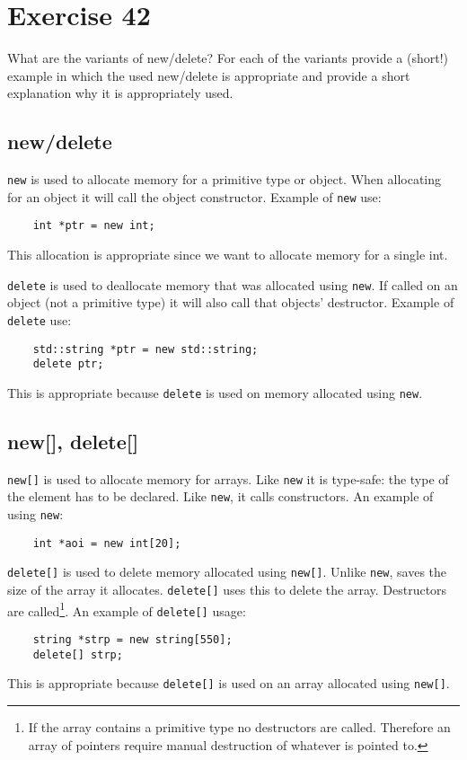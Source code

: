
\section*{Exercise 42}

\begin{question}
What are the variants of new/delete? For each of the variants provide a (short!) example in which the used new/delete is appropriate and provide a short explanation why it is appropriately used. 

\end{question}
\begin{solution}
\subsection*{new/delete}
\texttt{new} is used to allocate memory for a primitive type or object. When allocating for an object it will call the object constructor. Example of \texttt{new} use:
    \begin{verbatim}
    int *ptr = new int;
    \end{verbatim}
This allocation is appropriate since we want to allocate memory for a single int.

\texttt{delete} is used to deallocate memory that was allocated using \texttt{new}. 
If called on an object (not a primitive type) it will also call that objects' destructor.
Example of \texttt{delete} use:
    \begin{verbatim}
    std::string *ptr = new std::string; 
    delete ptr;
    \end{verbatim}
This is appropriate because \texttt{delete} is used on memory allocated using \texttt{new}.
\end{solution}

\subsection*{new[], delete[]}
\texttt{new[]} is used to allocate memory for arrays. Like \texttt{new} it is type-safe: the type of the element has to be declared. Like \texttt{new}, it calls constructors. An example of using \texttt{new}:
    \begin{verbatim}
    int *aoi = new int[20];
    \end{verbatim}
\texttt{delete[]} is used to delete memory allocated using \texttt{new[]}. Unlike \texttt{new},  saves the size of the array it allocates. \texttt{delete[]} uses this to delete the array. Destructors are called\footnote{If the array contains a primitive type no destructors are called. Therefore an array of pointers require manual destruction of whatever is pointed to.}. An example of \texttt{delete[]} usage:
    \begin{verbatim}
    string *strp = new string[550];
    delete[] strp;
    \end{verbatim}
This is appropriate because \texttt{delete[]} is used on an array allocated using \texttt{new[]}.

